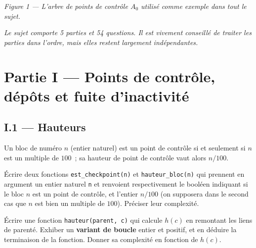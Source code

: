 \documentclass[11pt,a4paper]{article}
\begin{document}
\begin{center}

\emph{Figure 1 --- L'arbre de points de contrôle $A_0$ utilisé comme exemple dans tout le
sujet.}
\end{center}

\bigskip
\noindent\emph{Le sujet comporte 5 parties et 54 questions. Il est vivement conseillé de
traiter les parties dans l'ordre, mais elles restent largement indépendantes.}

\newpage

\section*{Partie I --- Points de contrôle, dépôts et fuite d'inactivité}

\subsection*{I.1 --- Hauteurs}

Un bloc de numéro $n$ (entier naturel) est un point de contrôle si et seulement si $n$ est
un multiple de $100$~; sa hauteur de point de contrôle vaut alors $n/100$.

\Q Écrire deux fonctions \texttt{est\_checkpoint(n)} et \texttt{hauteur\_bloc(n)} qui prennent en
argument un entier naturel \texttt{n} et renvoient respectivement le booléen indiquant si le
bloc $n$ est un point de contrôle, et l'entier $n/100$ (on supposera dans le second cas que
$n$ est bien un multiple de $100$). Préciser leur complexité.

\Q Écrire une fonction \texttt{hauteur(parent, c)} qui calcule $h(c)$ en remontant les liens
de parenté. Exhiber un \textbf{variant de boucle} entier et positif, et en déduire la
terminaison de la fonction. Donner sa complexité en fonction de $h(c)$.
\end{document}

